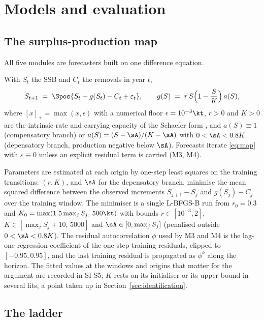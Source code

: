 \section{Models and evaluation}\label{sec:methods}

\subsection{The surplus-production map}\label{sec:map}

All five modules are forecasters built on one difference equation.

\begin{definition}\label{def:map}
With $S_t$ the SSB and $C_t$ the removals in year $t$,
\begin{equation}\label{eq:map}
S_{t+1} \;=\; \Spos{S_t + g(S_t) - C_t + \varepsilon_t}, \qquad
g(S) \;=\; r\,S\Bigl(1-\frac{S}{K}\Bigr)\,a(S),
\end{equation}
where $[x]_+ = \max(x,\epsilon)$ with a numerical floor $\epsilon = 10^{-3}\kt$, $r>0$ and $K>0$ are the intrinsic rate and carrying capacity of the Schaefer form \citep{Schaefer1954,Pella1969}, and $a(S)\equiv 1$ (compensatory branch) or $a(S) = (S-\sA)/(K-\sA)$ with $0<\sA<0.8K$ (depensatory branch, production negative below $\sA$). Forecasts iterate \eqref{eq:map} with $\varepsilon\equiv 0$ unless an explicit residual term is carried (M3, M4).
\end{definition}

Parameters are estimated at each origin by one-step least squares on the training transitions: $(r,K)$, and $\sA$ for the depensatory branch, minimise the mean squared difference between the observed increments $S_{j+1}-S_j$ and $g(S_j)-C_j$ over the training window. The minimiser is a single L-BFGS-B run from $r_0 = 0.3$ and $K_0 = \max(1.5\max_j S_j,\,500\kt)$ with bounds $r\in[10^{-3},2]$, $K\in[\max_j S_j + 10,\,5000]$ and $\sA\in[0,\max_j S_j]$ (penalised outside $0<\sA<0.8K$). The residual autocorrelation $\phi$ used by M3 and M4 is the lag-one regression coefficient of the one-step training residuals, clipped to $[-0.95,0.95]$, and the last training residual is propagated as $\phi^k$ along the horizon. The fitted values at the windows and origins that matter for the argument are recorded in SI S5; $K$ rests on its initialiser or its upper bound in several fits, a point taken up in Section~\ref{sec:identification}.

\subsection{The ladder}\label{sec:ladder}

